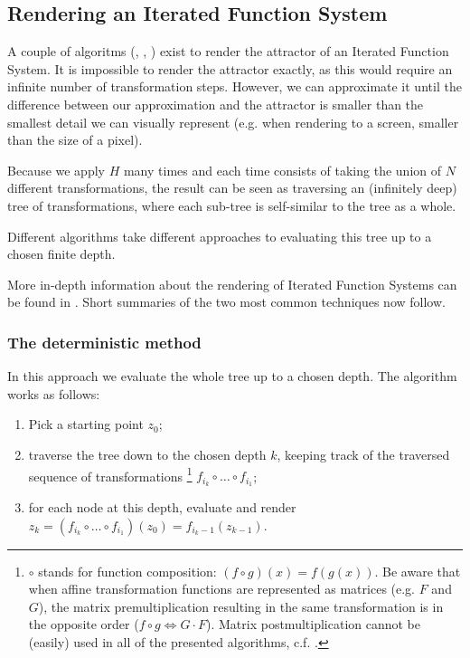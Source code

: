 \documentclass[11pt]{article}
\begin{document}
\subsection{Rendering an Iterated Function System}
\label{sec:org89ff80f}

A couple of algoritms (\cite{barnsley1988fractals}, \cite{hepting1991rendering}, \cite{lawlor2012gpu}) exist to render the attractor of an Iterated Function System. 
It is impossible to render the attractor exactly, as this would require an infinite number of transformation steps.
However, we can approximate it until the difference between our approximation and the attractor is smaller than
the smallest detail we can visually represent (e.g. when rendering to a screen, smaller than the size of a pixel).

Because we apply \(H\) many times and each time consists of taking the union of \(N\) different transformations,
the result can be seen as traversing an (infinitely deep) tree of transformations, 
where each sub-tree is self-similar to the tree as a whole.


Different algorithms take different approaches to evaluating this tree up to a chosen finite depth.

More in-depth information about the rendering of Iterated Function Systems can be found in \cite{hepting1991rendering}. 
Short summaries of the two most common techniques now follow.

\subsubsection{The deterministic method}
\label{sec:org9b190b6}

In this approach we evaluate the whole tree up to a chosen depth. The algorithm works as follows:

\begin{enumerate}
\item Pick a starting point \(z_0\);
\item traverse the tree down to the chosen depth \(k\), keeping track of the traversed sequence of transformations \footnote{\(\circ\) stands for function composition: \((f \circ g)(x) = f(g(x))\). 
Be aware that when affine transformation functions are represented as matrices (e.g. \(F\) and \(G\)), the matrix premultiplication resulting in the same transformation is in the opposite order (\(f \circ g \Leftrightarrow G \cdot F\)). Matrix postmultiplication cannot be (easily) used in all of the presented algorithms, c.f. \cite{hepting1991rendering}.}
\(f_{i_k} \circ \ldots \circ f_{i_1}\);
\item for each node at this depth, evaluate and render \(z_k = (f_{i_k} \circ \ldots \circ f_{i_1})(z_0) = f_{i_k-1}(z_{k-1})\).
\end{enumerate}
\end{document}

